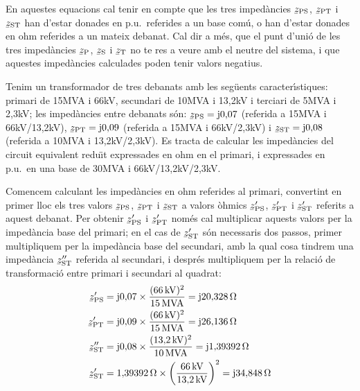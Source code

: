 En aquestes equacions cal tenir en compte que les tres imped\`{a}ncies $\cmplx{z}\ped{PS}$, $\cmplx{z}\ped{PT}$ i $\cmplx{z}\ped{ST}$ han d'estar donades en p.u.\ referides a un base com\'{u}, o han d'estar donades en ohm referides a un mateix debanat. Cal dir a m\'{e}s, que el punt d'uni\'{o} de les tres imped\`{a}ncies $\cmplx{z}\ped{P}$, $\cmplx{z}\ped{S}$ i $\cmplx{z}\ped{T}$ no te res a veure amb el neutre del sistema, i que aquestes imped\`{a}ncies calculades poden tenir valors  negatius.


\begin{exemple}
    Tenim un transformador de tres debanats amb les seg\"{u}ents caracter\'{\i}stiques: primari de 15\unit{MVA} i 66\unit{kV}, secundari de 10\unit{MVA} i 13,2\unit{kV} i terciari de 5\unit{MVA} i 2,3\unit{kV}; les imped\`{a}ncies entre debanats s\'{o}n: $\cmplx{z}\ped{PS} = \ju 0{,}07$ (referida a 15\unit{MVA} i 66\unit{kV}/13,2\unit{kV}), $\cmplx{z}\ped{PT} = \ju 0{,}09$ (referida a 15\unit{MVA} i 66\unit{kV}/2,3\unit{kV}) i $\cmplx{z}\ped{ST} = \ju 0{,}08$ (referida a 10\unit{MVA} i 13,2\unit{kV}/2,3\unit{kV}).  Es tracta de calcular les imped\`{a}ncies del circuit equivalent redu\"{\i}t expressades en ohm en el primari, i expressades en p.u.\ en una base de 30\unit{MVA} i 66\unit{kV}/13,2\unit{kV}/2,3\unit{kV}.

    Comencem calculant les imped\`{a}ncies en ohm referides al primari, convertint en primer lloc els tres valors $\cmplx{z}\ped{PS}$, $\cmplx{z}\ped{PT}$ i $\cmplx{z}\ped{ST}$ a valors \`{o}hmics $\cmplx{z}\ped{PS}'$, $\cmplx{z}\ped{PT}'$ i $\cmplx{z}\ped{ST}'$ referits a aquest debanat. Per obtenir $\cmplx{z}\ped{PS}'$ i $\cmplx{z}\ped{PT}'$ nom\'{e}s cal multiplicar aquests valors per la imped\`{a}ncia base del primari; en el cas de $\cmplx{z}\ped{ST}'$ s\'{o}n necessaris dos passos, primer multipliquem per la imped\`{a}ncia base del secundari, amb la qual cosa tindrem una imped\`{a}ncia $\cmplx{z}\ped{ST}''$ referida al secundari,  i despr\'{e}s multipliquem per la relaci\'{o} de transformaci\'{o} entre primari i secundari al quadrat:
    \begin{align*}
        \cmplx{z}\ped{PS}' &=  \ju 0{,}07 \times \frac{(66\unit{kV})^2}{15\unit{MVA}} = \ju 20{,}328\unit{\ohm}\\
        \cmplx{z}\ped{PT}' &=  \ju 0{,}09 \times \frac{(66\unit{kV})^2}{15\unit{MVA}} = \ju 26{,}136\unit{\ohm}\\
        \cmplx{z}\ped{ST}'' &=  \ju 0{,}08 \times \frac{(13{,}2\unit{kV})^2}{10\unit{MVA}} = \ju 1{,}39392\unit{\ohm}\\
        \cmplx{z}\ped{ST}' &=  1{,}39392\unit{\ohm} \times {\left(\frac{66\unit{kV}}{13{,}2\unit{kV}}\right)}^2 = \ju 34{,}848\unit{\ohm}
    \end{align*}


\end{exemple}
